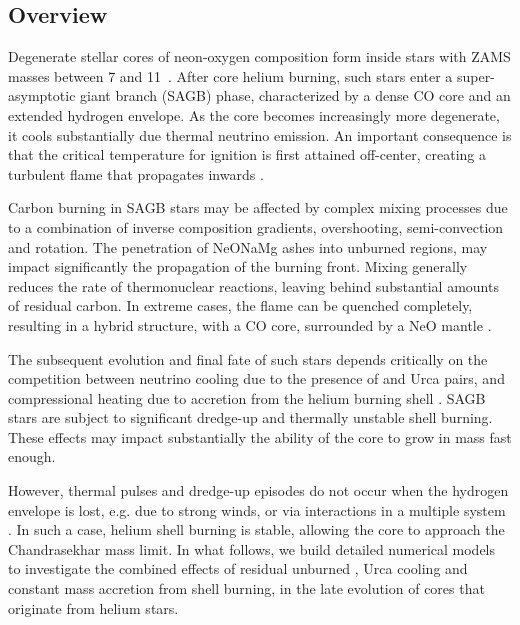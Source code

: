 \documentclass{aa}
\begin{document}
\subsection{Overview}
Degenerate stellar cores of neon-oxygen composition form inside stars with ZAMS masses  
between  7 and 11\msun\ \citep{Farmer:2015afs,Woosley:2019sdf}. 
After core helium burning, such stars enter a super-asymptotic giant branch 
(SAGB) phase, characterized by a dense CO  
core and an  extended hydrogen envelope.  
As the core becomes increasingly more degenerate, it cools substantially 
due thermal neutrino emission. An important consequence is that the critical 
temperature for  ignition is first attained off-center, creating a 
turbulent flame that propagates inwards \citep{siess2006}. 
 

Carbon burning in SAGB stars may be affected by complex mixing processes 
due to a combination of inverse composition gradients, overshooting, 
semi-convection and rotation. The penetration of 
NeONaMg ashes into unburned regions, may impact significantly the propagation of
the burning front. Mixing generally reduces the rate of thermonuclear reactions, leaving 
behind substantial amounts of residual carbon. In extreme cases, the flame can be 
quenched completely, resulting in a hybrid structure,  with a CO core, 
surrounded by a NeO mantle \citep{Denissenkov:2013qaa}. 

The subsequent evolution and final fate of such stars depends  critically on the competition 
between neutrino cooling due to the presence of  and 
 Urca pairs, and compressional heating due to accretion from the helium burning shell \citep{Schwab:2017epw}. 
SAGB stars are subject to significant dredge-up  and 
thermally unstable shell burning. 
These effects may impact substantially the ability of the core to grow in mass fast enough. 

However, thermal pulses and dredge-up episodes do not 
occur when the hydrogen envelope 
is lost, e.g. due to strong winds, or via  interactions   in a multiple system \citep{Woosley:2019sdf}.  
In such a case, helium shell burning is stable, allowing  
the core to approach the Chandrasekhar mass limit. 
In what follows, we build detailed numerical models to 
investigate the combined effects 
of residual unburned , Urca cooling and constant mass accretion from shell 
burning, in the late evolution of \one cores that originate from helium stars. 
\end{document}
